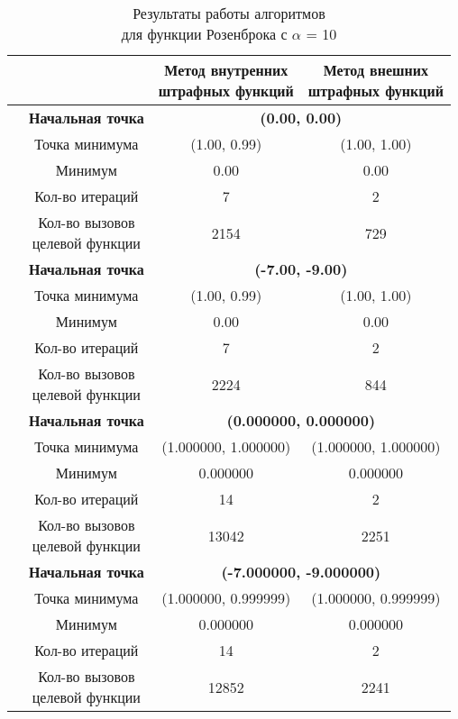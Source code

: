 \begin{table}[H]
        \centering
        \vspace*{-1.5em}
        \caption{Результаты работы алгоритмов\\для функции Розенброка с $\alpha$ = 10}
        \footnotesize
        \begin{tabular}{|c|c|c|c|}
        \hline
        & &\makecell{Метод внутренних\\штрафных функций} &\makecell{Метод внешних\\штрафных функций} \\
        \hline
	\multirow{8}{*}{\rotatebox[origin=c]{90}{$\varepsilon = 0.01$}}&\textbf{Начальная точка} &\multicolumn{2}{c|}{\textbf{(0.00, 0.00)}}\\
	\cline{2-4}
	&Точка минимума &(1.00, 0.99) &(1.00, 1.00) \\ 
	\cline{2-4}
	&Минимум &0.00 &0.00 \\ 
	\cline{2-4}
	&Кол-во итераций &7 &2 \\ 
	\cline{2-4}
	&\makecell{Кол-во вызовов\\целевой функции} &2154 &729 \\ 
	\cline{2-4}
\cline{2-4}&\textbf{Начальная точка} &\multicolumn{2}{c|}{\textbf{(-7.00, -9.00)}}\\
	\cline{2-4}
	&Точка минимума &(1.00, 0.99) &(1.00, 1.00) \\ 
	\cline{2-4}
	&Минимум &0.00 &0.00 \\ 
	\cline{2-4}
	&Кол-во итераций &7 &2 \\ 
	\cline{2-4}
	&\makecell{Кол-во вызовов\\целевой функции} &2224 &844 \\ 
	\cline{2-4}
	\hline
	\multirow{8}{*}{\rotatebox[origin=c]{90}{$\varepsilon = 1e-06$}}&\textbf{Начальная точка} &\multicolumn{2}{c|}{\textbf{(0.000000, 0.000000)}}\\
	\cline{2-4}
	&Точка минимума &(1.000000, 1.000000) &(1.000000, 1.000000) \\ 
	\cline{2-4}
	&Минимум &0.000000 &0.000000 \\ 
	\cline{2-4}
	&Кол-во итераций &14 &2 \\ 
	\cline{2-4}
	&\makecell{Кол-во вызовов\\целевой функции} &13042 &2251 \\ 
	\cline{2-4}
\cline{2-4}&\textbf{Начальная точка} &\multicolumn{2}{c|}{\textbf{(-7.000000, -9.000000)}}\\
	\cline{2-4}
	&Точка минимума &(1.000000, 0.999999) &(1.000000, 0.999999) \\ 
	\cline{2-4}
	&Минимум &0.000000 &0.000000 \\ 
	\cline{2-4}
	&Кол-во итераций &14 &2 \\ 
	\cline{2-4}
	&\makecell{Кол-во вызовов\\целевой функции} &12852 &2241 \\ 
	\cline{2-4}
	\hline

\end{tabular}
\end{table}


